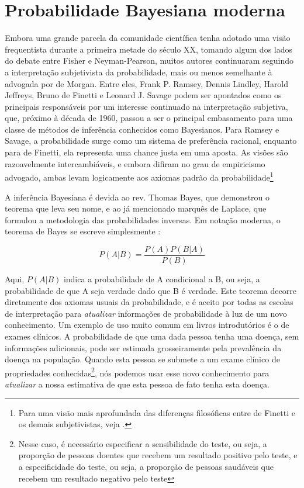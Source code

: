 \section{Probabilidade Bayesiana moderna}\label{sec:bayes}

Embora uma grande parcela da comunidade científica tenha adotado uma visão frequentista durante a primeira metade do século XX,
tomando algum dos lados do debate entre Fisher e Neyman-Pearson, muitos autores continuaram seguindo a interpretação 
subjetivista da probabilidade, mais ou menos semelhante à advogada por de Morgan. Entre eles, Frank P. Ramsey, Dennis Lindley,
Harold Jeffreys, Bruno de Finetti e Leonard J. Savage
podem ser apontados como os principais responsáveis por um interesse continuado na interpretação subjetiva, que, próximo à
década de 1960, passou a ser o principal embasamento para uma classe de métodos de inferência conhecidos como Bayesianos. 
Para Ramsey e Savage, a probabilidade surge como um sistema de preferência racional, enquanto para de Finetti, ela representa
uma chance justa em uma aposta. As visões são razoavelmente intercambiáveis, e embora difiram
no grau de empiricismo advogado,
ambas levam logicamente aos axiomas padrão da probabilidade\footnote{Para uma visão mais aprofundada das diferenças
filosóficas entre de Finetti e os demais subjetivistas, veja \citep{Galavotti89}.}

A inferência Bayesiana é devida ao rev. Thomas Bayes, que demonstrou o teorema que leva seu nome, e ao já mencionado marquês de
Laplace, que formulou a metodologia das probabilidades inversas. Em notação moderna, o teorema de Bayes se escreve simplesmente
\citep{Morettin09}:

\begin{equation}
	P(A|B) = \frac{P(A)P(B|A)}{P(B)}
\end{equation}

Aqui, $P(A|B)$ indica a probabilidade de A condicional a B, ou seja, a probabilidade de que A seja verdade dado que B é verdade.
Este teorema decorre diretamente dos axiomas usuais da probabilidade, e é aceito por todas as escolas de interpretação
para {\em atualizar} informações de probabilidade à luz de um novo conhecimento. Um exemplo de uso muito comum em livros
introdutórios é o de exames clínicos. A probabilidade de que uma dada pessoa tenha uma doença, sem informações adicionais,
pode ser estimada grosseiramente pela prevalência da doença na população. Quando esta pessoa se submete a um exame clínico
de propriedades conhecidas\footnote{Nesse caso, é necessário especificar a sensibilidade do teste, ou seja, 
a proporção de pessoas doentes que recebem um resultado positivo pelo teste, e a especificidade do teste, ou seja,
a proporção de pessoas saudáveis que recebem um resultado negativo pelo teste}, nós podemos usar esse novo conhecimento
para {\em atualizar} a nossa estimativa de que esta pessoa de fato tenha esta doença.

